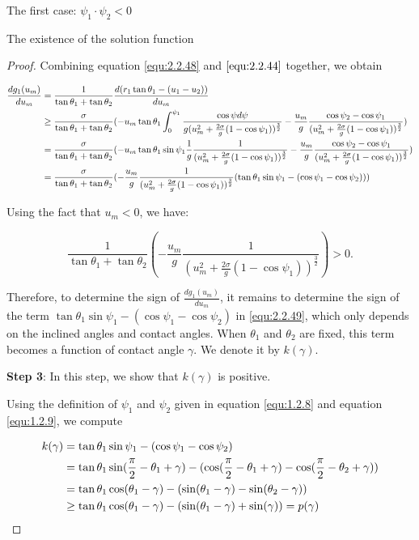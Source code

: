 \documentclass[letterpaper,reqno,10pt,twoside]{amsart}
\theoremstyle{definition}
\theoremstyle{remark}
\begin{document}
\begin{section}{The first case: $\psi_1\cdot \psi_2<0$ }
\begin{subsection}{The existence of the solution function}
\begin{proof}
    Combining equation \eqref{equ:2.2.48} and $\eqref{equ:2.2.44}$ together, we obtain

   \begin{align}
       \frac{dg_{1}(u_{m})}{du_{m}}&=\frac{1}{\tan\theta_1+\tan\theta_2}\frac{d(r_1\tan\theta_1-(u_1-u_2))}{du_{m}}\notag\\
       &\geq \frac{\sigma}{\tan\theta_1+\tan\theta_2}(-u_{m}\tan\theta_1\int_{0}^{\psi_1}\frac{\cos\psi d\psi}{g(u_m^{2}+\frac{2\sigma}{g}(1-\cos\psi_1))^{\frac{3}{2}}}-\frac{u_{m}}{g}\frac{\cos\psi_2-\cos\psi_1}{(u_m^{2}+\frac{2\sigma}{g}(1-\cos\psi_1))^{\frac{3}{2}}}) \notag\\
       &=\frac{\sigma}{\tan\theta_1+\tan\theta_2}(-u_{m}\tan\theta_1\sin\psi_1\frac{1}{g}\frac{1}{(u_m^{2}+\frac{2\sigma}{g}(1-\cos\psi_1))^{\frac{3}{2}}}-\frac{u_{m}}{g}\frac{\cos\psi_2-\cos\psi_1}{(u_m^{2}+\frac{2\sigma}{g}(1-\cos\psi_1))^{\frac{3}{2}}}) \notag\\
        &=\frac{\sigma}{\tan\theta_1+\tan\theta_2}(-\frac{u_m}{g}\frac{1}{(u_m^{2}+\frac{2\sigma}{g}(1-\cos\psi_1))^{\frac{3}{2}}}(\tan\theta_1\sin\psi_1-(\cos\psi_1-\cos\psi_2))) \label{equ:2.2.49}
   \end{align}
   
  \noindent Using the fact that $u_m<0$, we have:

  \begin{equation*}
  \frac{1}{\tan\theta_1+\tan\theta_2}(-\frac{u_m}{g}\frac{1}{(u_{m}^{2}+\frac{2\sigma}{g}(1-\cos\psi_1))^{\frac{3}{2}}})>0.
  \end{equation*}
  
  \noindent Therefore, to determine the sign of $\frac{dg_{1}(u_{m})}{du_{m}}$, it remains to determine the sign of the term $\tan\theta_1\sin\psi_1-(\cos\psi_1-\cos\psi_2)$ in \eqref{equ:2.2.49}, which only depends on the inclined angles and contact angles. When $\theta_{1}$ and $\theta_{2}$ are fixed, this term becomes a function of contact angle $\gamma$. We denote it by $k(\gamma)$.
  
  \textbf{Step 3}: In this step, we show that $k(\gamma)$ is positive. 
  
  Using the definition of $\psi_1$ and $\psi_2$ given in equation \eqref{equ:1.2.8} and equation \eqref{equ:1.2.9}, we compute

  \begin{align*}
      k(\gamma)&=\tan\theta_1\sin\psi_1-(\cos\psi_1-\cos\psi_2) \notag\\
       &=\tan\theta_1\sin(\frac{\pi}{2}-\theta_1+\gamma)-(\cos(\frac{\pi}{2}-\theta_1+\gamma)-\cos(\frac{\pi}{2}-\theta_2+\gamma)) \notag\\
        &=\tan\theta_1\cos(\theta_1-\gamma)-(\sin(\theta_1-\gamma)-\sin(\theta_2-\gamma))\notag \\
         &\geq \tan\theta_1\cos(\theta_1-\gamma)-(\sin(\theta_1-\gamma)+\sin(\gamma))=p(\gamma)
  \end{align*}
  

\end{proof}
\end{subsection}
\end{section}
\end{document}
